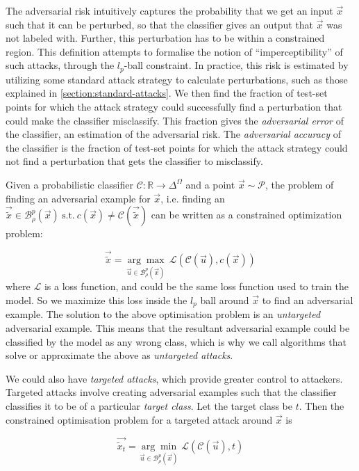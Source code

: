 \documentclass{ociamthesis}
\begin{document}
The adversarial risk intuitively captures the probability that we get an input
$\vec{x}$ such that it can be perturbed, so that the classifier gives an output
that $\vec{x}$ was not labeled with. Further, this perturbation has to be within
a constrained region. This definition attempts to formalise the notion of
``imperceptibility'' of such attacks, through the $l_p$-ball constraint. In
practice, this risk is estimated by utilizing some standard attack strategy to
calculate perturbations, such as those explained in
\cref{section:standard-attacks}. We then find the fraction of test-set points
for which the attack strategy could successfully find a perturbation that could
make the classifier misclassify. This fraction gives the \emph{adversarial
error} of the classifier, an estimation of the adversarial risk. The
\emph{adversarial accuracy} of the classifier is the fraction of test-set points
for which the attack strategy could not find a perturbation that gets the
classifier to misclassify.


Given a probabilistic classifier $\mathcal{C}: \mathbb{R}\to\Delta^\Omega$ and a
point $\vec{x} \sim \mathcal{P}$, the problem of finding an adversarial example
for $\vec{x}$, i.e. finding an $\vec{\tilde{x}} \in
\mathcal{B}_\rho^p(\vec{x})~\text{s.t.}~c(\vec{x}) \neq
\mathcal{C}(\vec{\tilde{x}})$ can be written as a constrained optimization
problem:

\begin{equation*}
    \vec{\tilde{x}} = \underset{\vec{u} \in \mathcal{B}_\rho^p(\vec{x})}
    {\arg\max}~\mathcal{L}(\mathcal{C}(\vec{u}), c(\vec{x}))
\end{equation*}
where $\mathcal{L}$ is a loss function, and could be the same loss function used
to train the model. So we maximize this loss inside the $l_p$ ball around
$\vec{x}$ to find an adversarial example. The solution to the above optimisation
problem is an \emph{untargeted} adversarial example. This means that the
resultant adversarial example could be classified by the model as any wrong
class, which is why we call algorithms that solve or approximate the above as
\emph{untargeted attacks}.

We could also have \emph{targeted attacks}, which provide greater control to
attackers. Targeted attacks involve creating adversarial examples such that the
classifier classifies it to be of a particular \emph{target class}. Let the
target class be $t$. Then the constrained optimisation problem for a targeted
attack around $\vec{x}$ is

\begin{equation*}
    \vec{\tilde{x}_t} = \underset{\vec{u} \in \mathcal{B}_\rho^p(\vec{x})}
    {\arg\min}~\mathcal{L}(\mathcal{C}(\vec{u}), t)
\end{equation*}
\end{document}
